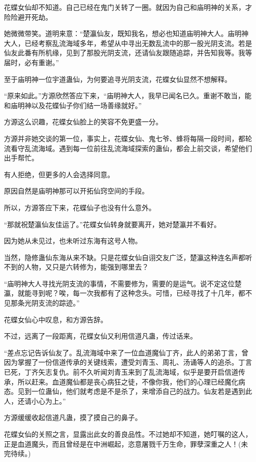 \begin{this_body}
花蝶女仙却不知道。自己已经在鬼门关转了一圈。就因为自己和庙明神的关系，才险险避开死劫。

她微微带笑。道明来意：“楚瀛仙友，既知我名，想必也知道庙明神大人。庙明神大人，已经考察乱流海域多年，希望从中寻出无数乱流中的那一股光阴支流。若是仙友此番有所机缘，见到了那股光阴支流，还请仙友跟随追踪，并告知我等。我等届时，必有重谢。”

至于庙明神一位宇道蛊仙，为何要追寻光阴支流，花蝶女仙显然不想解释。

“原来如此。”方源欣然答应下来，“庙明神大人，我早已闻名已久。重谢不敢当，能和庙明神以及花蝶仙子你们结一场善缘就好。”

方源这么识趣，花蝶女仙脸上的笑容不免更盛一分。

方源并非她交谈的第一位，事实上，花蝶女仙、鬼七爷、蜂将每隔一段时间，都轮流看守乱流海域。遇到每一位前往乱流海域探索的蛊仙，都会上前交谈，希望他们出手帮忙。

有人拒绝，但更多的人会选择同意。

原因自然是庙明神那可以开拓仙窍空间的手段。

所以，方源答应下来，花蝶仙子也没有什么意外。

“那就祝楚瀛仙友佳运了。”花蝶女仙转身就要离开，她对楚瀛并不看好。

因为她从未见过，也未听过东海有这号人物。

当然，隐修蛊仙东海从来不缺。只是花蝶女仙自诩交友广泛，楚瀛这种连名声都听不到的人物，又只是六转修为，能强到哪里去？

“庙明神大人寻找光阴支流的事情，不需要修为，需要的是运气。说不定这位楚瀛，就能寻到呢？唉，每一次我都有了这种念头。可惜，已经寻找了十几年，都不见那条光阴支流的踪迹。”

花蝶女仙心中叹息，和方源告辞。

不过，远离了一段距离，花蝶女仙又利用信道凡蛊，传过话来。

“差点忘记告诉仙友了。乱流海域中来了一位血道魔仙丁齐，此人的弟弟丁言，曾因为掌握了一份信道传承的关键线索，遭受刘青玉、周礼、汤诵等人的追杀。丁言已死，丁齐矢志复仇。前不久听闻刘青玉来到了乱流海域，似乎是要开启信道传承，所以赶来。血道魔仙都是丧心病狂之徒，不像你我，他们的心理已经魔化病态。见到一位蛊仙，他们就考虑是不是杀了，来增添自己的战力。仙友若是遇到此人，还请小心为上。”

方源缓缓收起信道凡蛊，摸了摸自己的鼻子。

花蝶女仙的关照之言，显露出此女的善良品性。不过她却不知道，她叮嘱的这人，正是血道魔头，而且曾经是在中洲崛起，恣意屠戮千万生命，罪孽深重之人！(未完待续。)

\end{this_body}

